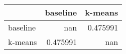\begin{tabular}{lrr}
\toprule
          &   baseline &    k-means \\
\midrule
 baseline & nan        &   0.475991 \\
 k-means  &   0.475991 & nan        \\
\bottomrule
\end{tabular}
